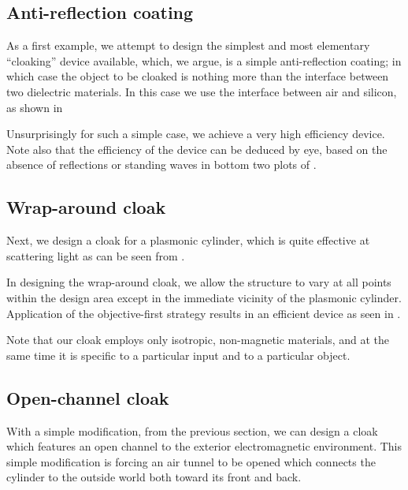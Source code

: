 \subsection{Anti-reflection coating}
As a first example,
    we attempt to design the simplest and most elementary ``cloaking'' device available,
    which, we argue, is a simple anti-reflection coating;
    in which case the object to be cloaked is nothing more than
    the interface between two dielectric materials.
In this case we use the interface between air and silicon, as shown in 

Unsurprisingly for such a simple case, 
    we achieve a very high efficiency device.
Note also that the efficiency of the device can be deduced by eye,
    based on the absence of reflections or standing waves 
    in bottom two plots of .

\subsection{Wrap-around cloak}
Next, we design a cloak for a plasmonic cylinder,
    which is quite effective at scattering light
    as can be seen from .

In designing the wrap-around cloak,
    we allow the structure to vary at all points within the design area
    except in the immediate vicinity of the plasmonic cylinder.
Application of the objective-first strategy results
    in an efficient device as seen in .

Note that our cloak employs only isotropic, non-magnetic materials,
    and at the same time it is specific to a particular input
    and to a particular object.

\subsection{Open-channel cloak}
With a simple modification, from the previous section,
    we can design a cloak which features an open channel
    to the exterior electromagnetic environment.
This simple modification is forcing an air tunnel
    to be opened which connects the cylinder to the outside world
    both toward its front and back.

